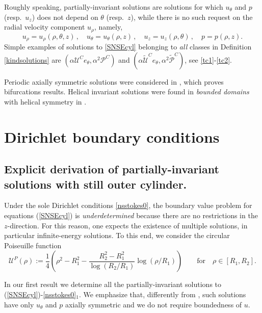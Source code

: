 \documentclass[a4paper,11pt]{amsart}
\numberwithin{equation}{section}
\numberwithin{figure}{section}
\def\U{{\mathcal U}}
\def\P{{\mathcal P}}
\def\eq#1{(\ref{#1})}
\begin{document}
	Roughly speaking, partially-invariant solutions are solutions for which $u_\theta$ and $p$ (resp.\ $u_z$) does not depend on
	$\theta$ (resp.\ $z$), while there is no such request on the radial velocity component $u_\rho$, namely,
	\begin{equation}\label{assumption}
		u_\rho=u_\rho(\rho,\theta,z)\, ,\quad u_\theta=u_\theta(\rho,z)\, ,\quad u_z=u_z(\rho,\theta)\, ,\quad p=p(\rho,z).
	\end{equation}
	Simple examples of solutions to \eqref{SNSEcyl} belonging to {\em all} classes in Definition \ref{kindsolutions} are
	$(\alpha\U^C e_\theta,\alpha^2\P^C)$ and $(\alpha{\widetilde\U}^Ce_\theta,\alpha^2{\widetilde\P^C})$, see \eqref{tc1}-\eqref{tc2}.
	
	Periodic axially symmetric solutions were considered in \cite{velte1966}, which proves bifurcations results.
	Helical invariant solutions were found in {\it bounded domains} with helical symmetry in \cite{korobkov2022existence}.
	
	
	\section{Dirichlet boundary conditions}\label{Dirichlet}
	
	
	\subsection{Explicit derivation of partially-invariant solutions with still outer cylinder.}\label{sec-parinv}

    Under the sole Dirichlet conditions \eqref{nsstokes0}, the boundary value problem for equations \eq{SNSEcyl} is {\em underdetermined} because
	there are no restrictions in the $z$-direction. For this reason, one expects the existence of multiple solutions, in particular
	infinite-energy solutions. To this end, we consider the circular Poiseuille function
    \begin{equation}\label{Ualphabeta}
        \U^P(\rho):=
        \frac{1}{4} \left(\rho^2-R_1^2 - \frac{R_2^2-R_1^2}{\log (R_2/R_1)}\log(\rho/R_1) \right)\qquad \text{for} \quad \rho\in [R_1,R_2].
    \end{equation}

	In our first result we determine all the partially-invariant solutions to \eq{SNSEcyl}-\eqref{nsstokes0}$_1$. We emphasize that, differently from \cite{kozono2023liouville}, such solutions have only $u_\theta$ and $p$ axially symmetric and we do not require boundedness of $u$.
	
\end{document}
